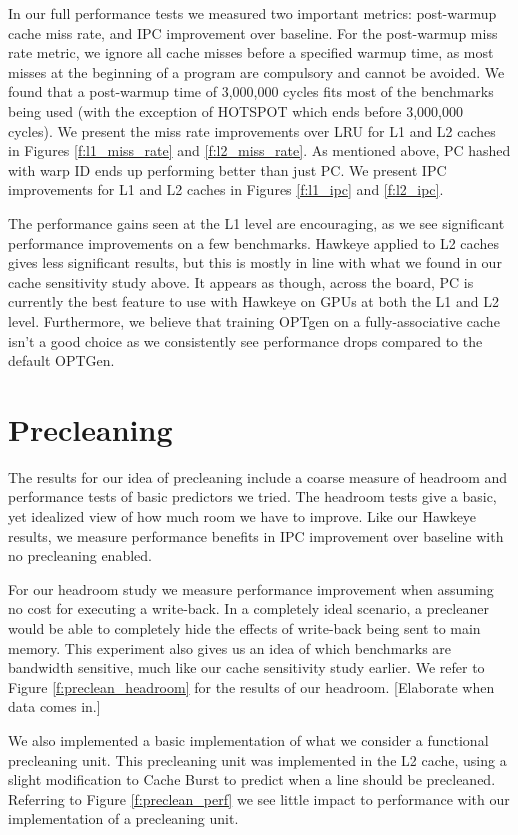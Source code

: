 In our full performance tests we measured two important metrics: post-warmup cache miss rate, and IPC improvement over baseline. For the post-warmup miss rate metric, we ignore all cache misses before a specified warmup time, as most misses at the beginning of a program are compulsory and cannot be avoided. We found that a post-warmup time of 3,000,000 cycles fits most of the benchmarks being used (with the exception of HOTSPOT which ends before 3,000,000 cycles). We present the miss rate improvements over LRU for L1 and L2 caches in Figures \ref{f:l1_miss_rate} and \ref{f:l2_miss_rate}. As mentioned above, PC hashed with warp ID ends up performing better than just PC. We present IPC improvements for L1 and L2 caches in Figures \ref{f:l1_ipc} and \ref{f:l2_ipc}.

The performance gains seen at the L1 level are encouraging, as we see significant performance improvements on a few benchmarks. Hawkeye applied to L2 caches gives less significant results, but this is mostly in line with what we found in our cache sensitivity study above. It appears as though, across the board, PC is currently the best feature to use with Hawkeye on GPUs at both the L1 and L2 level. Furthermore, we believe that training OPTgen on a fully-associative cache isn't a good choice as we consistently see performance drops compared to the default OPTGen.

\section{Precleaning}

The results for our idea of precleaning include a coarse measure of headroom and performance tests of basic predictors we tried. The headroom tests give a basic, yet idealized view of how much room we have to improve. Like our Hawkeye results, we measure performance benefits in IPC improvement over baseline with no precleaning enabled.

For our headroom study we measure performance improvement when assuming no cost for executing a write-back. In a completely ideal scenario, a precleaner would be able to completely hide the effects of write-back being sent to main memory. This experiment also gives us an idea of which benchmarks are bandwidth sensitive, much like our cache sensitivity study earlier. We refer to Figure \ref{f:preclean_headroom} for the results of our headroom. [Elaborate when data comes in.]

We also implemented a basic implementation of what we consider a functional precleaning unit. This precleaning unit was implemented in the L2 cache, using a slight modification to Cache Burst \cite{cache_burst} to predict when a line should be precleaned. Referring to Figure \ref{f:preclean_perf} we see little impact to performance with our implementation of a precleaning unit.

